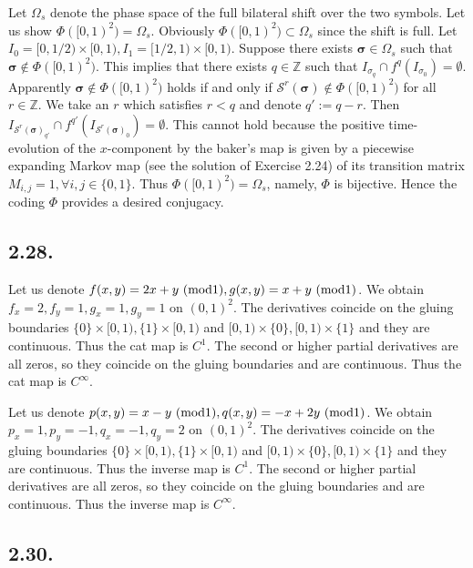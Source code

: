 \documentclass[a4paper,11pt,fleqn]{article}
\begin{document}
Let $\Omega_s$ denote the phase space of the full bilateral shift over the two symbols. Let us show $\Phi([0,1)^2)=\Omega_s$. 
Obviously $\Phi([0,1)^2) \subset \Omega_s$ since the shift is full. 
Let $I_0 = [0,1/2)\times [0,1), I_1 = [1/2,1)\times [0,1)$. Suppose there exists ${\bm \sigma}\in \Omega_s$ such that ${\bm \sigma} \notin \Phi([0,1)^2)$. This implies that there exists $q\in\mathbb{Z}$ such that $I_{\sigma_q} \cap f^q(I_{\sigma_0}) = \emptyset$. Apparently ${\bm \sigma} \notin \Phi([0,1)^2)$ holds if and only if $\mathcal{S}^{r}({\bm \sigma}) \notin \Phi([0,1)^2)$ for all $r\in \mathbb{Z}$. We take an $r$ which satisfies $r<q$ and denote $q':=q-r$. Then $I_{\mathcal{S}^{r}({\bm \sigma})_{q'}} \cap f^{q'}(I_{\mathcal{S}^{r}({\bm \sigma})_0}) = \emptyset$. This cannot hold because the positive time-evolution of the $x$-component by the baker's map is given by a piecewise expanding Markov map (see the solution of Exercise 2.24) of its transition matrix $M_{i,j}=1, \forall i,j\in \{0, 1\}$. Thus $\Phi([0,1)^2)=\Omega_s$, namely, $\Phi$ is bijective. Hence the coding $\Phi$ provides a desired conjugacy.  
\hruleskip

\subsection{2.28.}
Let us denote $f(x,y) = 2x+y \ ({\rm mod} 1), g(x,y) = x+y \ ({\rm mod} 1)$. 
We obtain $f_x=2,f_y=1,g_x=1,g_y=1$ on $(0,1)^2$. The derivatives coincide on the gluing boundaries $\{0\}\times [0,1), \{1\}\times [0,1)$ and $[0,1)\times\{0\}, [0,1)\times\{1\}$ and they are continuous. Thus the cat map is $C^1$. The second or higher partial derivatives are all zeros, so they coincide on the gluing boundaries and are continuous.  Thus the cat map is $C^\infty$.

Let us denote $p(x,y) = x-y \ ({\rm mod} 1), q(x,y) = -x+2y \ ({\rm mod} 1)$. 
We obtain $p_x=1,p_y=-1,q_x=-1,q_y=2$ on $(0,1)^2$. The derivatives coincide on the gluing boundaries $\{0\}\times [0,1), \{1\}\times [0,1)$ and $[0,1)\times\{0\}, [0,1)\times\{1\}$ and they are continuous. Thus the inverse map is $C^1$. The second or higher partial derivatives are all zeros, so they coincide on the gluing boundaries and are continuous.  Thus the inverse map is $C^\infty$.
\hruleskip

\subsection{2.30.}
\end{document}
